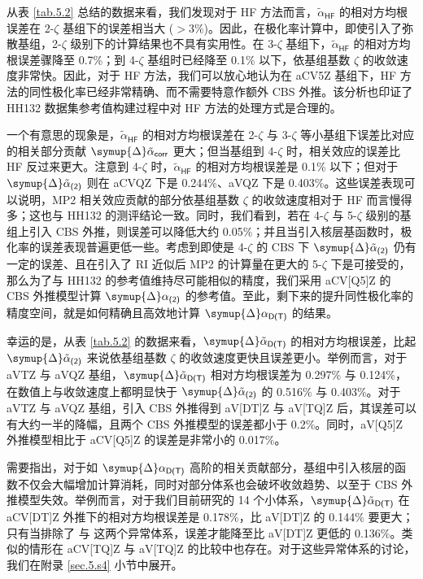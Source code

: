 从表 \ref{tab.5.2} 总结的数据来看，我们发现对于 HF 方法而言，$\tilde \alpha_\textsf{HF}$ 的相对方均根误差在 2-$\zeta$ 基组下的误差相当大 ($> 3\%$)。因此，在极化率计算中，即使引入了弥散基组，2-$\zeta$ 级别下的计算结果也不具有实用性。在 3-$\zeta$ 基组下，$\tilde \alpha_\textsf{HF}$ 的相对方均根误差骤降至 0.7\%；到 4-$\zeta$ 基组时已经降至 0.1\% 以下，依基组基数 $\zeta$ 的收敛速度非常快。因此，对于 HF 方法，我们可以放心地认为在 aCV5Z 基组下，HF 方法的同性极化率已经非常精确、而不需要特意作额外 CBS 外推。该分析也印证了 HH132 数据集参考值构建过程中对 HF 方法的处理方式是合理的\cite{Hait-Head-Gordon.PCCP.2018}。

一个有意思的现象是，$\tilde \alpha_\textsf{HF}$ 的相对方均根误差在 2-$\zeta$ 与 3-$\zeta$ 等小基组下误差比对应的相关部分贡献 $\symup{\Delta} \tilde \alpha_\textsf{corr}$ 更大；但当基组到 4-$\zeta$ 时，相关效应的误差比 HF 反过来更大。注意到 4-$\zeta$ 时，$\tilde \alpha_\textsf{HF}$ 的相对方均根误差是 0.1\% 以下；但对于 $\symup{\Delta} \tilde \alpha_\textsf{(2)}$ 则在 aCVQZ 下是 0.244\%、aVQZ 下是 0.403\%。这些误差表现可以说明，MP2 相关效应贡献的部分依基组基数 $\zeta$ 的收敛速度相对于 HF 而言慢得多；这也与 HH132 的测评结论一致\cite{Hait-Head-Gordon.PCCP.2018}。同时，我们看到，若在 4-$\zeta$ 与 5-$\zeta$ 级别的基组上引入 CBS 外推，则误差可以降低大约 0.05\%；并且当引入核层基函数时，极化率的误差表现普遍更低一些。考虑到即使是 4-$\zeta$ 的 CBS 下 $\symup{\Delta} \tilde \alpha_\textsf{(2)}$ 仍有一定的误差、且在引入了 RI 近似后 MP2 的计算量在更大的 5-$\zeta$ 下是可接受的，那么为了与 HH132 的参考值维持尽可能相似的精度，我们采用 aCV[Q5]Z 的 CBS 外推模型计算 $\symup{\Delta} \alpha_\textsf{(2)}$ 的参考值。至此，剩下来的提升同性极化率的精度空间，就是如何精确且高效地计算 $\symup{\Delta} \alpha_\textsf{D(T)}$ 的结果。

幸运的是，从表 \ref{tab.5.2} 的数据来看，$\symup{\Delta} \tilde \alpha_\textsf{D(T)}$ 的相对方均根误差，比起 $\symup{\Delta} \tilde \alpha_\textsf{(2)}$ 来说依基组基数 $\zeta$ 的收敛速度更快且误差更小。举例而言，对于 aVTZ 与 aVQZ 基组，$\symup{\Delta} \tilde \alpha_\textsf{D(T)}$ 相对方均根误差为 0.297\% 与 0.124\%，在数值上与收敛速度上都明显快于 $\symup{\Delta} \tilde \alpha_\textsf{(2)}$ 的 0.516\% 与 0.403\%。对于 aVTZ 与 aVQZ 基组，引入 CBS 外推得到 aV[DT]Z 与 aV[TQ]Z 后，其误差可以有大约一半的降幅，且两个 CBS 外推模型的误差都小于 0.2\%。同时，aV[Q5]Z 外推模型相比于 aCV[Q5]Z 的误差是非常小的 0.017\%。

需要指出，对于如 $\symup{\Delta} \alpha_\textsf{D(T)}$ 高阶的相关贡献部分，基组中引入核层的函数不仅会大幅增加计算消耗，同时对部分体系也会破坏收敛趋势、以至于 CBS 外推模型失效。举例而言，对于我们目前研究的 14 个小体系，$\symup{\Delta} \tilde \alpha_\textsf{D(T)}$ 在 aCV[DT]Z 外推下的相对方均根误差是 0.178\%，比 aV[DT]Z 的 0.144\% 要更大；只有当排除了  与  这两个异常体系，误差才能降至比 aV[DT]Z 更低的 0.136\%。类似的情形在 aCV[TQ]Z 与 aV[TQ]Z 的比较中也存在。对于这些异常体系的讨论，我们在附录 \ref{sec.5.s4} 小节中展开。

